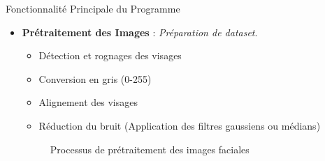 \documentclass{beamer}
\begin{document}
\begin{frame}{Fonctionnalité Principale du Programme}
    \begin{itemize}
        \item \textbf{Prétraitement des Images} : \textit{Préparation de dataset}.
        \begin{itemize}
            \item Détection et rognages des visages
            \item Conversion en gris (0-255)
            \item Alignement des visages
            \item Réduction du bruit (Application des filtres gaussiens ou médians)
        \end{itemize}

        \vspace{0.2cm}
        \begin{figure}[ht]
            \centering
            \caption{Processus de prétraitement des images faciales}
            \label{fig:preprocessing_flow}
        \end{figure}
    \end{itemize}
\end{frame}
\end{document}
